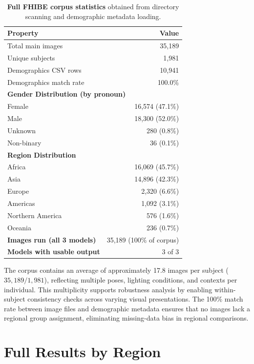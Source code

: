 \documentclass[letterpaper]{article} %
\begin{document}
\begin{table}[h]
\centering
\caption{\textbf{Full FHIBE corpus statistics} obtained from directory scanning and demographic metadata loading.}
\label{tab:full_corpus}
\begin{tabular}{lr}
\toprule
\textbf{Property} & \textbf{Value} \\
\midrule
Total main images & 35{,}189 \\
Unique subjects & 1{,}981 \\
Demographics CSV rows & 10{,}941 \\
Demographics match rate & 100.0\% \\
\midrule
\multicolumn{2}{l}{\textbf{Gender Distribution (by pronoun)}} \\
\quad Female & 16{,}574 (47.1\%) \\
\quad Male & 18{,}300 (52.0\%) \\
\quad Unknown & 280 (0.8\%) \\
\quad Non-binary & 36 (0.1\%) \\
\midrule
\multicolumn{2}{l}{\textbf{Region Distribution}} \\
\quad Africa & 16{,}069 (45.7\%) \\
\quad Asia & 14{,}896 (42.3\%) \\
\quad Europe & 2{,}320 (6.6\%) \\
\quad Americas & 1{,}092 (3.1\%) \\
\quad Northern America & 576 (1.6\%) \\
\quad Oceania & 236 (0.7\%) \\
\midrule
\textbf{Images run (all 3 models)} & 35{,}189 (100\% of corpus) \\
\textbf{Models with usable output} & 3 of 3 \\
\bottomrule
\end{tabular}
\end{table}

The corpus contains an average of approximately 17.8 images per subject ($35{,}189 / 1{,}981$), reflecting multiple poses, lighting conditions, and contexts per individual. This multiplicity supports robustness analysis by enabling within-subject consistency checks across varying visual presentations. The 100\% match rate between image files and demographic metadata ensures that no images lack a regional group assignment, eliminating missing-data bias in regional comparisons.

\section{Full Results by Region}
\label{app:full_results}
\end{document}
